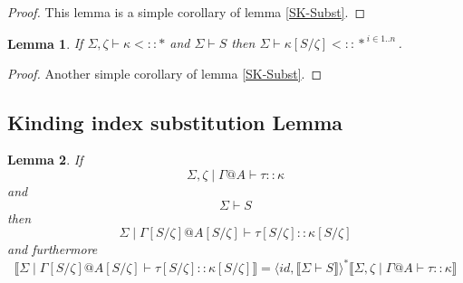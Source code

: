 \documentclass{article}
\newtheorem{lemma}{Lemma}
\newcommand{\sem}[1]{\llbracket #1 \rrbracket}
\begin{document}
\begin{proof}
This lemma is a simple corollary of lemma \ref{SK-Subst}.
\end{proof}


\begin{lemma}
If $\Sigma,\zeta \vdash \kappa <:: \ast$ and $\Sigma \vdash S$ then
$\Sigma \vdash \kappa[S/\zeta] <:: \ast^{~i \in 1..n}$.
\label{SK-Subst3}
\end{lemma}

\begin{proof}
Another simple corollary of lemma \ref{SK-Subst}.
\end{proof}

\subsection*{Kinding index substitution Lemma}

\begin{lemma}
If $$\Sigma,\zeta \mid \Gamma @ A \vdash \tau :: \kappa$$ and $$\Sigma \vdash S$$ then $$\Sigma \mid \Gamma[S/\zeta] @ A[S/\zeta] \vdash \tau[S/\zeta ] :: \kappa [S/\zeta ]$$ and furthermore $$\sem{\Sigma \mid \Gamma[S/\zeta] @ A[S/\zeta] \vdash \tau[S/\zeta] :: \kappa[S/\zeta]} = \langle \mathit{id}, \sem{\Sigma \vdash S} \rangle^* \sem{\Sigma,\zeta \mid \Gamma @ A \vdash \tau :: \kappa}$$
\end{lemma}
\end{document}
